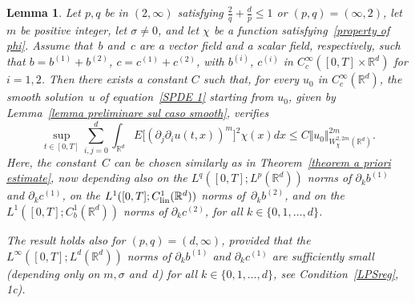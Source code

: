 \documentclass[a4paper,10pt]{article}
\newtheorem{lemma}[theorem]{Lemma}
\newcommand\1{\mathbbm{1}}
\newcommand\lin{{\rm lin}}
\numberwithin{equation}{section}
\begin{document}
\begin{lemma}
Let $p,q$ be in $(2,\infty)$ satisfying $\frac{2}{q}+\frac{d}{p}\leq1$ or $(p,q)=(\infty,2)$,
let $m$ be positive integer, let $\sigma \neq 0$, and let $\chi$ be a function 
satisfying~\eqref{property of phi}. Assume that~$b$ and~$c$ are a vector field and a scalar field, respectively, such that $b=b^{(1)}+b^{(2)}$, $c=c^{(1)}+c^{(2)}$, with $b^{(i)}$, $c^{(i)}$ in $C_{c}^{\infty}([0,T]\times \mathbb{R}^{d})$ for $i=1,2$. Then there exists a constant $C$ such that, for every $u_{0}$ in $C_{c}^{\infty}(\mathbb{R}^{d})$, the smooth solution~$u$ of equation~\eqref{SPDE 1} starting from $u_{0}$, given by Lemma~\ref{lemma preliminare sul caso smooth}, verifies
\begin{equation*}
\sup_{t\in [0,T]}\sum_{i,j=0}^{d} \int_{\mathbb{R}^{d}} E\big[ (\partial_j \partial_{i}u(t,x))^{m} \big]^{2} \chi(x) dx\leq C \Vert u_{0} \Vert_{W_{\chi}^{2,2m}(\mathbb{R}^{d}) }^{2m}.
\end{equation*}
Here, the constant~$C$ can be chosen similarly as in Theorem~\ref{theorem a priori estimate}, now depending also on the $L^{q}([0,T];L^{p}(\mathbb{R}^{d}))$ norms of $\partial_k b^{(1)}$ and $\partial_k c^{(1)}$, on the $L^{1}([0,T];C_{\lin}^{1}(\mathbb{R}^{d}))$ norms of~$\partial_k b^{(2)}$, and on the $L^{1}([0,T];C_{b}^{1}(\mathbb{R}^{d}))$ norms of $\partial_k c^{(2)}$, for all $k \in \{0,1,\ldots,d\}$.

The result holds also for $(p,q)=(d,\infty)$, provided that the $L^{\infty}([0,T];L^{d}(\mathbb{R}^{d}))$ norms of $\partial_k b^{(1)}$ and $\partial_k c^{(1)}$ are sufficiently small \textup{(}depending only on $m,\sigma$ and~$d$\textup{)} for all $k \in \{0,1,\ldots,d\}$, see Condition~\ref{LPSreg}, \textup{1c)}.
\end{lemma}
\end{document}
